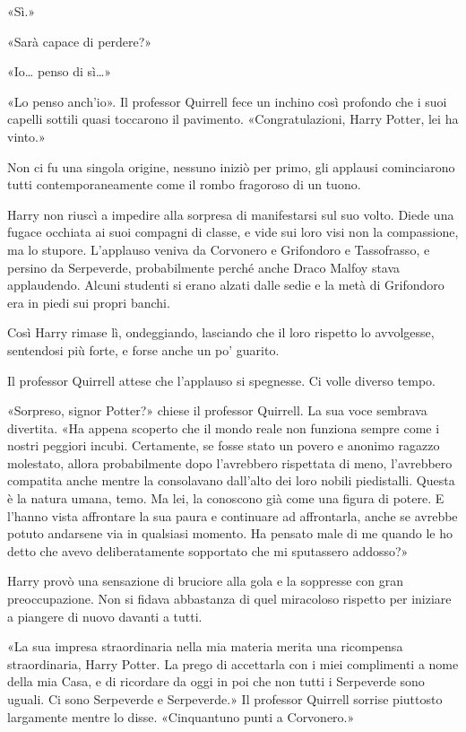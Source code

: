 «Sì.»

«Sarà capace di perdere?»

«Io… penso di sì…»

«Lo penso anch’io». Il professor Quirrell fece un inchino così profondo che i suoi capelli sottili quasi toccarono il pavimento. «Congratulazioni, Harry Potter, lei ha vinto.»

Non ci fu una singola origine, nessuno iniziò per primo, gli applausi cominciarono tutti contemporaneamente come il rombo fragoroso di un tuono.

Harry non riuscì a impedire alla sorpresa di manifestarsi sul suo volto. Diede una fugace occhiata ai suoi compagni di classe, e vide sui loro visi non la compassione, ma lo stupore. L’applauso veniva da Corvonero e Grifondoro e Tassofrasso, e persino da Serpeverde, probabilmente perché anche Draco Malfoy stava applaudendo. Alcuni studenti si erano alzati dalle sedie e la metà di Grifondoro era in piedi sui propri banchi.

Così Harry rimase lì, ondeggiando, lasciando che il loro rispetto lo avvolgesse, sentendosi più forte, e forse anche un po’ guarito.

Il professor Quirrell attese che l’applauso si spegnesse. Ci volle diverso tempo.

«Sorpreso, signor Potter?» chiese il professor Quirrell. La sua voce sembrava divertita. «Ha appena scoperto che il mondo reale non funziona sempre come i nostri peggiori incubi. Certamente, se fosse stato un povero e anonimo ragazzo molestato, allora probabilmente dopo l’avrebbero rispettata di meno, l’avrebbero compatita anche mentre la consolavano dall’alto dei loro nobili piedistalli. Questa è la natura umana, temo. Ma lei, la conoscono già come una figura di potere. E l’hanno vista affrontare la sua paura e continuare ad affrontarla, anche se avrebbe potuto andarsene via in qualsiasi momento. Ha pensato male di me quando le ho detto che avevo deliberatamente sopportato che mi sputassero addosso?»

Harry provò una sensazione di bruciore alla gola e la soppresse con gran preoccupazione. Non si fidava abbastanza di quel miracoloso rispetto per iniziare a piangere di nuovo davanti a tutti.

«La sua impresa straordinaria nella mia materia merita una ricompensa straordinaria, Harry Potter. La prego di accettarla con i miei complimenti a nome della mia Casa, e di ricordare da oggi in poi che non tutti i Serpeverde sono uguali. Ci sono Serpeverde e Serpeverde.» Il professor Quirrell sorrise piuttosto largamente mentre lo disse. «Cinquantuno punti a Corvonero.»

